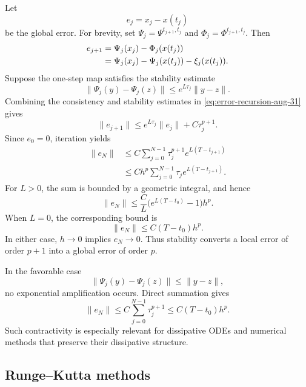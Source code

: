 Let
\[
  e_j=x_j-x(t_j)
\]
be the global error. For brevity, set
\(\Psi_j=\Psi^{t_{j+1},t_j}\) and
\(\Phi_j=\Phi^{t_{j+1},t_j}\). Then
\begin{align}
  e_{j+1}
  &=\Psi_j(x_j)-\Phi_j(x(t_j))\notag\\
  &=\Psi_j(x_j)-\Psi_j(x(t_j))-\xi_j(x(t_j)).
  \label{eq:error-recursion-aug-31}
\end{align}
Suppose the one-step map satisfies the stability estimate
\begin{equation}\label{eq:step-stability-aug-31}
  \lVert\Psi_j(y)-\Psi_j(z)\rVert
  \leq e^{L\tau_j}\lVert y-z\rVert.
\end{equation}
Combining the consistency and stability estimates in
\eqref{eq:error-recursion-aug-31} gives
\begin{equation}\label{eq:error-bound-one-step-aug-31}
  \lVert e_{j+1}\rVert
  \leq e^{L\tau_j}\lVert e_j\rVert+C\tau_j^{p+1}.
\end{equation}
Since \(e_0=0\), iteration yields
\begin{align*}
  \lVert e_N\rVert
  &\leq C\sum_{j=0}^{N-1}
    \tau_j^{p+1}e^{L(T-t_{j+1})}\\
  &\leq Ch^p\sum_{j=0}^{N-1}
    \tau_j e^{L(T-t_{j+1})}.
\end{align*}
For \(L>0\), the sum is bounded by a geometric integral, and hence
\begin{equation}\label{eq:global-error-bound-aug-31}
  \lVert e_N\rVert
  \leq \frac{C}{L}\bigl(e^{L(T-t_0)}-1\bigr)h^p.
\end{equation}
When \(L=0\), the corresponding bound is
\[
  \lVert e_N\rVert\leq C(T-t_0)h^p.
\]
In either case, \(h\to0\) implies \(e_N\to0\). Thus stability converts
a local error of order \(p+1\) into a global error of order \(p\).

\begin{remark}
  In the favorable case
  \[
    \lVert\Psi_j(y)-\Psi_j(z)\rVert\leq\lVert y-z\rVert,
  \]
  no exponential amplification occurs. Direct summation gives
  \[
    \lVert e_N\rVert
    \leq C\sum_{j=0}^{N-1}\tau_j^{p+1}
    \leq C(T-t_0)h^p.
  \]
  Such contractivity is especially relevant for dissipative ODEs and
  numerical methods that preserve their dissipative structure.
\end{remark}

\subsection{Runge--Kutta methods}

